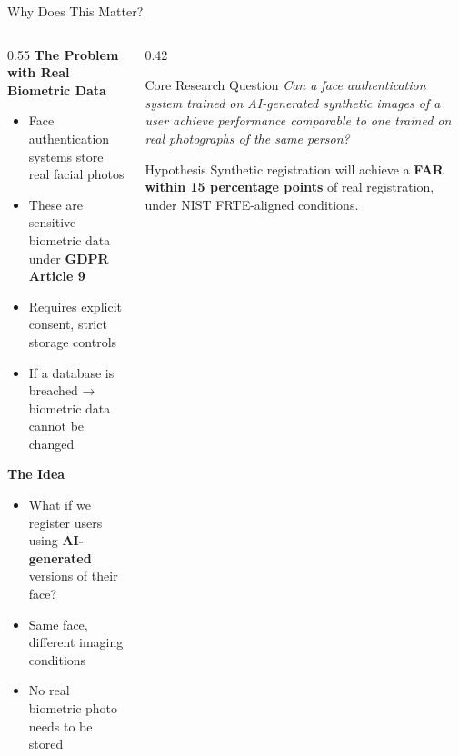 \documentclass[aspectratio=169]{beamer}
\begin{document}
\begin{frame}{Why Does This Matter?}

\begin{columns}[T]
\begin{column}{0.55\textwidth}
    \textbf{The Problem with Real Biometric Data}
    \begin{itemize}
        \item Face authentication systems store real facial photos
        \item These are sensitive biometric data under \textbf{GDPR Article 9}
        \item Requires explicit consent, strict storage controls
        \item If a database is breached → biometric data cannot be changed
    \end{itemize}

    \vspace{8pt}
    \textbf{The Idea}
    \begin{itemize}
        \item What if we register users using \textbf{AI-generated} versions of their face?
        \item Same face, different imaging conditions
        \item No real biometric photo needs to be stored
    \end{itemize}
\end{column}
\begin{column}{0.42\textwidth}
    \begin{block}{Core Research Question}
        \small
        \textit{Can a face authentication system trained on AI-generated synthetic images of a user achieve performance comparable to one trained on real photographs of the same person?}
    \end{block}
    \vspace{8pt}
    \begin{alertblock}{Hypothesis}
        \small
        Synthetic registration will achieve a \textbf{FAR within 15 percentage points} of real registration, under NIST FRTE-aligned conditions.
    \end{alertblock}
\end{column}
\end{columns}
\end{frame}
\end{document}
